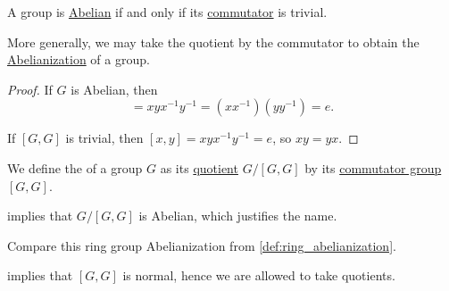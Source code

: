 \begin{proposition}\label{thm:abelian_group_iff_trivial_commutator}
  A group is \hyperref[def:abelian_group]{Abelian} if and only if its \hyperref[def:group_commutator]{commutator} is trivial.
\end{proposition}
\begin{comments}
  \item More generally, we may take the quotient by the commutator to obtain the \hyperref[def:group_abelianization]{Abelianization} of a group.
\end{comments}
\begin{proof}
  \SufficiencySubProof If \( G \) is Abelian, then
  \begin{equation*}
    [x, y] = xyx^{-1}y^{-1} = (xx^{-1}) (yy^{-1}) = e.
  \end{equation*}

  \NecessitySubProof If \( [G, G] \) is trivial, then \( [x, y] = xyx^{-1}y^{-1} = e \), so \( xy = yx \).
\end{proof}

\begin{definition}\label{def:group_abelianization}\mimprovised
  We define the  of a group \( G \) as its \hyperref[def:group/quotient]{quotient} \( G / [G, G] \) by its \hyperref[def:group_commutator]{commutator group} \( [G, G] \).
\end{definition}
\begin{comments}
  \item {} implies that \( G / [G, G] \) is Abelian, which justifies the name.

  \item Compare this ring group Abelianization from \cref{def:ring_abelianization}.
\end{comments}
\begin{defproof}
   implies that \( [G, G] \) is normal, hence we are allowed to take quotients.
\end{defproof}

